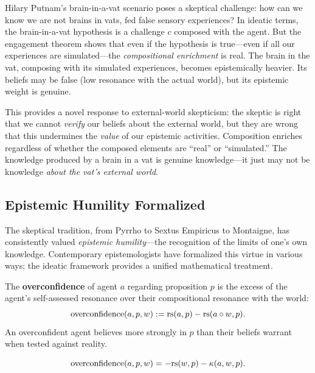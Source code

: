 \begin{interpretation}
Hilary Putnam's brain-in-a-vat scenario poses a skeptical challenge: how can we
know we are not brains in vats, fed false sensory experiences? In ideatic terms,
the brain-in-a-vat hypothesis is a challenge $c$ composed with the agent. But
the engagement theorem shows that even if the hypothesis is true---even if all
our experiences are simulated---the \emph{compositional enrichment} is real. The
brain in the vat, composing with its simulated experiences, becomes epistemically
heavier. Its beliefs may be false (low resonance with the actual world), but its
epistemic weight is genuine.

This provides a novel response to external-world skepticism: the skeptic is right
that we cannot \emph{verify} our beliefs about the external world, but they are
wrong that this undermines the \emph{value} of our epistemic activities. Composition
enriches regardless of whether the composed elements are ``real'' or ``simulated.''
The knowledge produced by a brain in a vat is genuine knowledge---it just may not
be knowledge \emph{about the vat's external world}.
\end{interpretation}

\subsection{Epistemic Humility Formalized}

The skeptical tradition, from Pyrrho to Sextus Empiricus to Montaigne, has
consistently valued \emph{epistemic humility}---the recognition of the limits
of one's own knowledge. Contemporary epistemologists have formalized this
virtue in various ways; the ideatic framework provides a unified mathematical
treatment.

\begin{definition}
\label{def:overconfidence}
The \textbf{overconfidence} of agent $a$ regarding proposition $p$ is the excess
of the agent's self-assessed resonance over their compositional resonance with
the world:
\[
  \mathrm{overconfidence}(a, p, w) := \mathrm{rs}(a, p) - \mathrm{rs}(a \circ w, p).
\]
An overconfident agent believes more strongly in $p$ than their beliefs warrant
when tested against reality.
\end{definition}

\begin{theorem}
\label{thm:overconfidence-decomp}
\[
  \mathrm{overconfidence}(a, p, w) = -\mathrm{rs}(w, p) - \kappa(a, w, p).
\]
\end{theorem}

